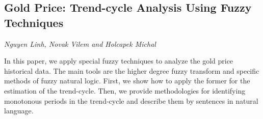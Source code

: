 \documentclass[../booklet.tex]{subfiles}
\begin{document}
\subsection[Gold Price: Trend-cycle Analysis Using Fuzzy Techniques. {\it Nguyen Linh, Novak Vilem and Holcapek Michal}]{Gold Price: Trend-cycle Analysis Using Fuzzy Techniques}
  

\begin{center}
  {\it Nguyen Linh, Novak Vilem and Holcapek Michal}
\end{center}



		In this paper, we apply special fuzzy techniques to analyze the gold price historical data. The main tools are the higher degree fuzzy transform and specific methods of fuzzy natural logic. First, we show how to apply the former for the estimation of the trend-cycle. Then, we provide methodologies for identifying monotonous periods in the trend-cycle and describe them by sentences in natural language. 
	
\end{document}
